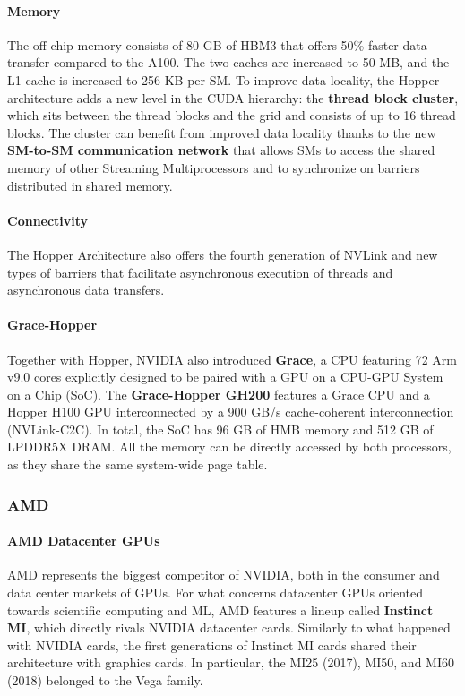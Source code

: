 \documentclass[conference]{IEEEtran}
\begin{document}
\paragraph{Memory}
The off-chip memory consists of 80 GB of HBM3 that offers 50\% faster data transfer compared to the A100. The two caches are increased to 50 MB, and the L1 cache is increased to 256 KB per SM.
To improve data locality, the Hopper architecture adds a new level in the CUDA hierarchy: the \textbf{thread block cluster}, which sits between the thread blocks and the grid and consists of up to 16 thread blocks. The cluster can benefit from improved data locality thanks to the new \textbf{SM-to-SM communication network} that allows SMs to access the shared memory of other Streaming Multiprocessors and to synchronize on barriers distributed in shared memory.
\paragraph{Connectivity}
The Hopper Architecture also offers the fourth generation of NVLink and new types of barriers that facilitate asynchronous execution of threads and asynchronous data transfers.
\paragraph{Grace-Hopper}
Together with Hopper, NVIDIA also introduced \textbf{Grace}, a CPU featuring 72 Arm v9.0 cores explicitly designed to be paired with a GPU on a CPU-GPU System on a Chip (SoC). 
The \textbf{Grace-Hopper GH200} features a Grace CPU and a Hopper H100 GPU interconnected by a 900 GB/s cache-coherent interconnection (NVLink-C2C). In total, the SoC has 96 GB of HMB memory and 512 GB of LPDDR5X DRAM. All the memory can be directly accessed by both processors, as they share the same system-wide page table.

 
\subsubsection{AMD}

\paragraph{AMD Datacenter GPUs}
AMD represents the biggest competitor of NVIDIA, both in the consumer and data center markets of GPUs. 
For what concerns datacenter GPUs oriented towards scientific computing and ML, AMD features a lineup called \textbf{Instinct MI}, which directly rivals NVIDIA datacenter cards.
Similarly to what happened with NVIDIA cards, the first generations of Instinct MI cards shared their architecture with graphics cards. In particular, the MI25 (2017), MI50, and MI60 (2018) belonged to the Vega family.
\end{document}
